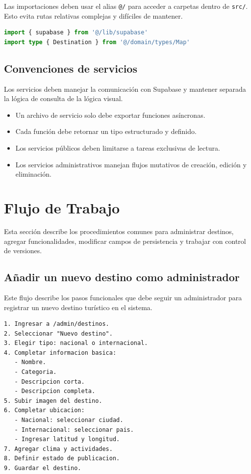 \documentclass[12pt,letterpaper]{article}
\newcommand{\code}[1]{\nolinkurl{#1}}
\begin{document}
Las importaciones deben usar el alias \code{@/} para acceder a carpetas dentro de \code{src/}. Esto evita rutas relativas complejas y difíciles de mantener.

\begin{lstlisting}[language=typescript]
import { supabase } from '@/lib/supabase'
import type { Destination } from '@/domain/types/Map'
\end{lstlisting}

\subsection{Convenciones de servicios}

Los servicios deben manejar la comunicación con Supabase y mantener separada la lógica de consulta de la lógica visual.

\begin{itemize}
    \item Un archivo de servicio solo debe exportar funciones asíncronas.
    \item Cada función debe retornar un tipo estructurado y definido.
    \item Los servicios públicos deben limitarse a tareas exclusivas de lectura.
    \item Los servicios administrativos manejan flujos mutativos de creación, edición y eliminación.
\end{itemize}

\section{Flujo de Trabajo}

Esta sección describe los procedimientos comunes para administrar destinos, agregar funcionalidades, modificar campos de persistencia y trabajar con control de versiones.

\subsection{Añadir un nuevo destino como administrador}

Este flujo describe los pasos funcionales que debe seguir un administrador para registrar un nuevo destino turístico en el sistema.

\begin{lstlisting}[language={}]
1. Ingresar a /admin/destinos.
2. Seleccionar "Nuevo destino".
3. Elegir tipo: nacional o internacional.
4. Completar informacion basica:
   - Nombre.
   - Categoria.
   - Descripcion corta.
   - Descripcion completa.
5. Subir imagen del destino.
6. Completar ubicacion:
   - Nacional: seleccionar ciudad.
   - Internacional: seleccionar pais.
   - Ingresar latitud y longitud.
7. Agregar clima y actividades.
8. Definir estado de publicacion.
9. Guardar el destino.
\end{lstlisting}
\end{document}

